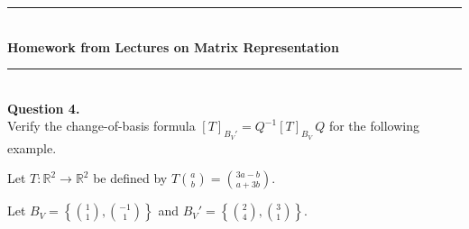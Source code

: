 \documentclass{article}
\newcommand{\RR}{\mathbb{R}}
\begin{document}
\bigskip
\begin{center}
\rule{0.5\textwidth}{1pt}\\[6pt]
\textbf{Homework from Lectures on Matrix Representation}\\[2pt]
\rule{0.5\textwidth}{1pt}
\end{center}
\bigskip


\hfill \break  $~\!\!$ \dotfill \medskip \\
\textbf{Question 4.}\\
Verify the change-of-basis formula $[T]_{B_V'} = Q^{-1}[T]_{B_V}\, Q$ for the following example.

Let $T : \RR^2 \to \RR^2$ be defined by $T\binom{a}{b} = \binom{3a - b}{a + 3b}$.

Let $B_V = \left\{\binom{1}{1}, \binom{-1}{1}\right\}$ and $B_V' = \left\{\binom{2}{4}, \binom{3}{1}\right\}$.
\end{document}
